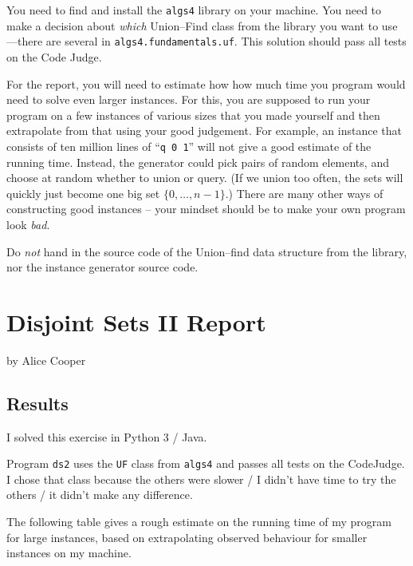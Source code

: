\documentclass{tufte-handout}
\begin{document}
You need to find and install the \texttt{algs4} library on your machine.
You need to make a decision about \emph{which} Union--Find class from the library you want to use---there are several in \texttt{algs4.fundamentals.uf}.
This solution should pass all tests on the Code Judge.

For the report, you will need to estimate how how much time you program would need to solve even larger instances.
For this, you are supposed to run your program on a few instances of various sizes that you made yourself and then extrapolate from that using your good judgement.
For example, an instance that consists of ten million lines of ``\texttt{q 0 1}'' will not give a good estimate of the running time.
Instead, the generator could pick pairs of random elements, and choose at random whether to union or query.
(If we union too often, the sets will quickly just become one big set $\{0,\ldots, n-1\}$.)
There are many other ways of constructing good instances -- your mindset should be to make your own program look \emph{bad}.

Do \emph{not} hand in the source code of the Union--find data structure from the library, nor the instance generator source code.

\newpage
\section{Disjoint Sets II Report}

by Alice Cooper

  \subsection{Results}
  
  I solved this exercise in Python 3 / Java.

  Program \texttt{ds2} uses the \texttt{UF} class from \texttt{algs4} and passes all tests on the CodeJudge.
  I chose that class because the others were slower / I didn't have time to try the others / it didn't make any difference.

  The following table gives a rough estimate on the running time of my program for large instances, based on extrapolating observed behaviour for smaller instances on my machine.
\end{document}
